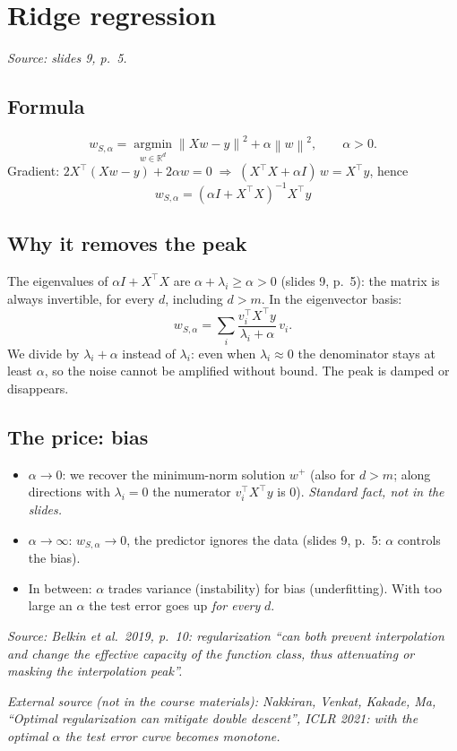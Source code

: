 \documentclass[11pt,a4paper]{article}
\newcommand{\R}{\mathbb{R}}
\newcommand{\norm}[1]{\left\lVert #1 \right\rVert}
\newcommand{\fonte}[1]{\par\noindent\textit{Source: #1}\par\smallskip}
\newcommand{\esterna}[1]{\par\noindent\textit{External source (not in the course materials): #1}\par\smallskip}
\begin{document}
\section{Ridge regression}
\fonte{slides 9, p.~5.}

\subsection{Formula}
\[
  w_{S,\alpha} = \operatorname*{argmin}_{w \in \R^d} \norm{Xw - y}^2 + \alpha \norm{w}^2 ,
  \qquad \alpha > 0 .
\]
Gradient: $2X^\top(Xw - y) + 2\alpha w = 0 \;\Rightarrow\; (X^\top X + \alpha I)\,w = X^\top y$, hence
\[
  \boxed{w_{S,\alpha} = (\alpha I + X^\top X)^{-1} X^\top y}
\]

\subsection{Why it removes the peak}
The eigenvalues of $\alpha I + X^\top X$ are $\alpha + \lambda_i \ge \alpha > 0$ (slides 9, p.~5): the matrix is always
invertible, for every $d$, including $d > m$. In the eigenvector basis:
\[
  w_{S,\alpha} = \sum_{i} \frac{v_i^\top X^\top y}{\lambda_i + \alpha}\, v_i .
\]
We divide by $\lambda_i + \alpha$ instead of $\lambda_i$: even when $\lambda_i \approx 0$ the denominator stays at least
$\alpha$, so the noise cannot be amplified without bound. The peak is damped or disappears.

\subsection{The price: bias}
\begin{itemize}
  \item $\alpha \to 0$: we recover the minimum-norm solution $w^{+}$ (also for $d > m$; along directions with
        $\lambda_i = 0$ the numerator $v_i^\top X^\top y$ is $0$). \emph{Standard fact, not in the slides.}
  \item $\alpha \to \infty$: $w_{S,\alpha} \to 0$, the predictor ignores the data (slides 9, p.~5: $\alpha$ controls the bias).
  \item In between: $\alpha$ trades variance (instability) for bias (underfitting). With too large an $\alpha$ the test
        error goes up \emph{for every} $d$.
\end{itemize}
\fonte{Belkin et al.\ 2019, p.~10: regularization ``can both prevent interpolation and change the effective capacity of the function class, thus attenuating or masking the interpolation peak''.}
\esterna{Nakkiran, Venkat, Kakade, Ma, ``Optimal regularization can mitigate double descent'', ICLR 2021: with the optimal
$\alpha$ the test error curve becomes monotone.}
\end{document}
